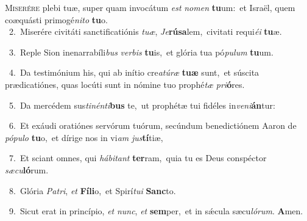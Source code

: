 \lettrine{\initial\textcolor{\initialcolor}{M}}{iserére} plebi tuæ, super quam invocátum \textit{est} \textit{no}\-\textit{men} \textbf{tu}\-um:~\star et Israël, quem coæquásti primogé\-\textit{ni}\-\textit{to} \textbf{tu}\-o.\\
{\numbfont\textcolor{\numbcolor}{~2.}}~Miserére civitáti sanctificatiónis \textit{tu}\-\textit{æ}, \textit{Je}\-\textbf{rú}\textbf{sa}lem,~\star civitati requi\-\textit{é}\-\textit{i} \textbf{tu}\-æ.\par
{\numbfont\textcolor{\numbcolor}{~3.}}~Reple Sion inenarrabíli\textit{bus} \textit{ver}\-\textit{bis} \textbf{tu}\-is,~\star et glória tua pó\-\textit{pu}\-\textit{lum} \textbf{tu}\-um.\par
{\numbfont\textcolor{\numbcolor}{~4.}}~Da testimónium his, qui ab inítio cre\-\textit{a}\-\textit{tú}\textit{ræ} \textbf{tu}\-\textbf{æ} sunt,~\star et súscita prædicatiónes, quas locúti sunt in nómine tuo prophé\textit{tæ} \textit{pri}\-\textbf{ó}res.\par
{\numbfont\textcolor{\numbcolor}{~5.}}~Da mercédem sus\-\textit{ti}\-\textit{nén}\textit{ti}\textbf{bus} te,~\star ut prophétæ tui fidéles in\-\textit{ve}\-\textit{ni}\textbf{án}tur:\par
{\numbfont\textcolor{\numbcolor}{~6.}}~Et exáudi oratiónes servórum tuórum, secúndum benedictiónem Aaron de \textit{pó}\-\textit{pu}\textit{lo} \textbf{tu}\-o,~\star et dírige nos in vi\textit{am} \textit{jus}\-\textbf{tí}tiæ,\par
{\numbfont\textcolor{\numbcolor}{~7.}}~Et sciant omnes, qui \textit{há}\-\textit{bi}\textit{tant} \textbf{ter}\-ram,~\star quia tu es Deus conspéctor \textit{sæ}\-\textit{cu}\textbf{ló}rum.\par
{\numbfont\textcolor{\numbcolor}{~8.}}~Glória \textit{Pa}\-\textit{tri}, \textit{et} \textbf{Fí}\-\textbf{li}o,~\star et Spirí\-\textit{tu}\-\textit{i} \textbf{Sanc}\-to.\par
{\numbfont\textcolor{\numbcolor}{~9.}}~Sicut erat in princípio, \textit{et} \textit{nunc}\-, \textit{et} \textbf{sem}\-per,~\star et in sǽcula sæcu\-\textit{ló}\-\textit{rum}. \textbf{A}\-men.\par
